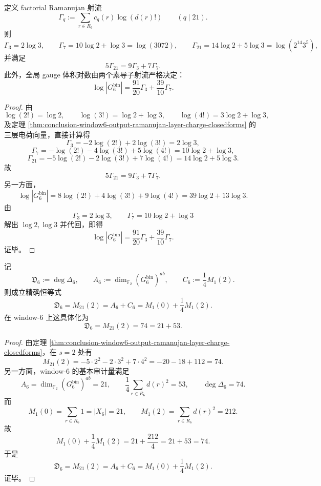 \begin{proposition}\label{prop:conclusion-window6-output-factorial-jets-recover-gauge-volume}
定义 factorial Ramanujan 射流
\[
\Gamma_q:=\sum_{r\in R_6}c_q(r)\log(d(r)!)
\qquad (q\mid 21).
\]
则
\[
\Gamma_3=2\log 3,
\qquad
\Gamma_7=10\log 2+\log 3=\log(3072),
\qquad
\Gamma_{21}=14\log 2+5\log 3=\log(2^{14}3^5),
\]
并满足
\[
5\Gamma_{21}=9\Gamma_3+7\Gamma_7.
\]
此外，全局 gauge 体积对数由两个素导子射流严格决定：
\[
\log |G_6^{\mathrm{bin}}|
=
\frac{91}{20}\Gamma_3+\frac{39}{10}\Gamma_7.
\]
\end{proposition}
\begin{proof}
由
\[
\log(2!)=\log 2,
\qquad
\log(3!)=\log 2+\log 3,
\qquad
\log(4!)=3\log 2+\log 3,
\]
及定理 \ref{thm:conclusion-window6-output-ramanujan-layer-charge-closedforms} 的三层电荷向量，直接计算得
\[
\Gamma_3=-2\log(2!)+2\log(3!)=2\log 3,
\]
\[
\Gamma_7=-\log(2!)-4\log(3!)+5\log(4!)
=10\log 2+\log 3,
\]
\[
\Gamma_{21}=-5\log(2!)-2\log(3!)+7\log(4!)
=14\log 2+5\log 3.
\]
故
\[
5\Gamma_{21}=9\Gamma_3+7\Gamma_7.
\]
另一方面，
\[
\log |G_6^{\mathrm{bin}}|
=8\log(2!)+4\log(3!)+9\log(4!)
=39\log 2+13\log 3.
\]
由
\[
\Gamma_3=2\log 3,
\qquad
\Gamma_7=10\log 2+\log 3
\]
解出 \(\log 2,\log 3\) 并代回，即得
\[
\log |G_6^{\mathrm{bin}}|
=
\frac{91}{20}\Gamma_3+\frac{39}{10}\Gamma_7.
\]
证毕。
\end{proof}

\begin{theorem}\label{thm:conclusion-window6-output-discriminant-degree-equals-conductor21-second-moment}
记
\[
\mathfrak D_6:=\deg \Delta_6,
\qquad
A_6:=\dim_{\mathbb F_2}(G_6^{\mathrm{bin}})^{ab},
\qquad
C_6:=\frac14 M_1(2).
\]
则成立精确恒等式
\[
\mathfrak D_6=M_{21}(2)=A_6+C_6=M_1(0)+\frac14 M_1(2).
\]
在 window-\(6\) 上这具体化为
\[
\mathfrak D_6=M_{21}(2)=74=21+53.
\]
\end{theorem}
\begin{proof}
由定理 \ref{thm:conclusion-window6-output-ramanujan-layer-charge-closedforms}，在 \(s=2\) 处有
\[
M_{21}(2)=-5\cdot 2^2-2\cdot 3^2+7\cdot 4^2
=-20-18+112
=74.
\]
另一方面，window-\(6\) 的基本审计量满足
\[
A_6=\dim_{\mathbb F_2}(G_6^{\mathrm{bin}})^{ab}=21,
\qquad
\frac14\sum_{r\in R_6}d(r)^2=53,
\qquad
\deg\Delta_6=74.
\]
而
\[
M_1(0)=\sum_{r\in R_6}1=|X_6|=21,
\qquad
M_1(2)=\sum_{r\in R_6}d(r)^2=212.
\]
故
\[
M_1(0)+\frac14 M_1(2)=21+\frac{212}{4}=21+53=74.
\]
于是
\[
\mathfrak D_6=M_{21}(2)=A_6+C_6=M_1(0)+\frac14 M_1(2).
\]
证毕。
\end{proof}

